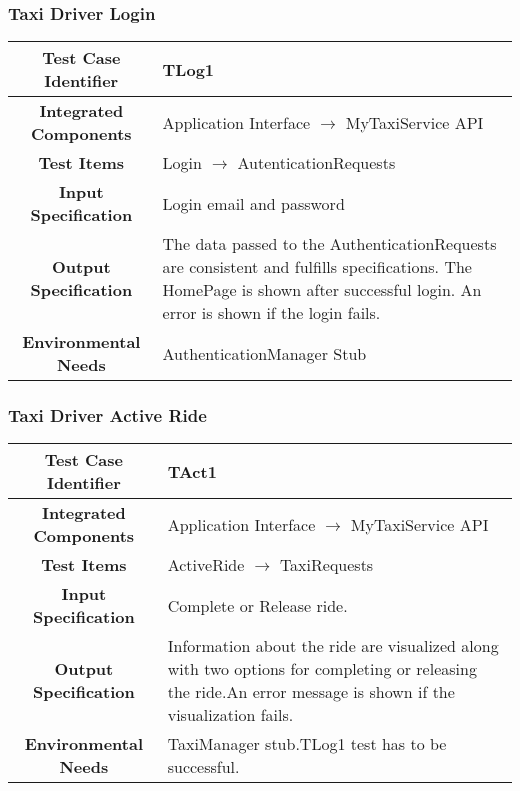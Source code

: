 \documentclass[11pt, a4paper,titlepage]{article}
\begin{document}
	\subsubsection{Taxi Driver Login}
	\begin{tabularx}{\textwidth}{| c|X|}
		\hline \textbf{Test Case Identifier} & \label{TLog1}TLog1 \\
		\hline \textbf{Integrated Components} & Application Interface $\rightarrow $ MyTaxiService API \\
		\hline \textbf{Test Items} & Login $\rightarrow $ AutenticationRequests \\
		\hline \textbf{Input Specification} & Login email and password \\
		\hline \textbf{Output Specification} & 
		The data passed to the AuthenticationRequests are consistent and fulfills specifications.\newline
		The HomePage is shown after successful login.\newline
		An error is shown if the login fails.  \\
		\hline \textbf{Environmental Needs} & AuthenticationManager Stub\\
		\hline
	\end{tabularx}
	\newline
	\newline
	\subsubsection{Taxi Driver Active Ride }
	\begin{tabularx}{\textwidth}{| c|X|}
		\hline \textbf{Test Case Identifier} & \label{TAct1}TAct1 \\
		\hline \textbf{Integrated Components} & Application Interface $\rightarrow $ MyTaxiService API \\
		\hline \textbf{Test Items} & ActiveRide $\rightarrow $ TaxiRequests \\
		\hline \textbf{Input Specification} & Complete or Release ride. \\
		\hline \textbf{Output Specification} & Information about the ride are visualized along with two options for completing or releasing the ride.\newline An error message is shown if the visualization fails. \\
		\hline \textbf{Environmental Needs} & TaxiManager stub.\newline TLog1 test has to be successful. \\
		\hline
	\end{tabularx}
	\newline
	\newline
\end{document}
